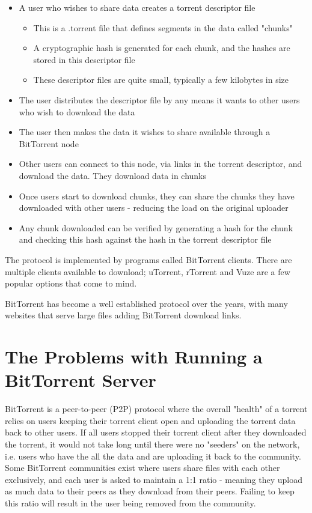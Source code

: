 \begin{itemize}
	\item A user who wishes to share data creates a torrent descriptor file
	\begin{itemize}	
		\item This is a .torrent file that defines segments in the data called "chunks"
		\item A cryptographic hash is generated for each chunk, and the hashes are stored in this descriptor file
		\item These descriptor files are quite small, typically a few kilobytes in size
	\end{itemize}  
	\item The user distributes the descriptor file by any means it wants to other users who wish to download the data
	\item The user then makes the data it wishes to share available through a BitTorrent node
	\item Other users can connect to this node, via links in the torrent descriptor, and download the data. They download data in chunks 
	\item Once users start to download chunks, they can share the chunks they have downloaded with other users - reducing the load on the original uploader
	\item Any chunk downloaded can be verified by generating a hash for the chunk and checking this hash against the hash in the torrent descriptor file
\end{itemize}

The protocol is implemented by programs called BitTorrent clients. There are multiple clients available to download; uTorrent\cite{uTorrent}, rTorrent\cite{rTorrent} and Vuze\cite{Vuze} are a few popular options that come to mind.

BitTorrent has become a well established protocol over the years, with many websites that serve large files adding BitTorrent download links.


\section{The Problems with Running a BitTorrent Server}
BitTorrent is a peer-to-peer (P2P) protocol where the overall "health" of a torrent relies on users keeping their torrent client open and uploading the torrent data back to other users. If all users stopped their torrent client after they downloaded the torrent, it would not take long until there were no "seeders" on the network, i.e. users who have the all the data and are uploading it back to the community. Some BitTorrent communities exist where users share files with each other exclusively, and each user is asked to maintain a 1:1 ratio - meaning they upload as much data to their peers as they download from their peers. Failing to keep this ratio will result in the user being removed from the community. 

